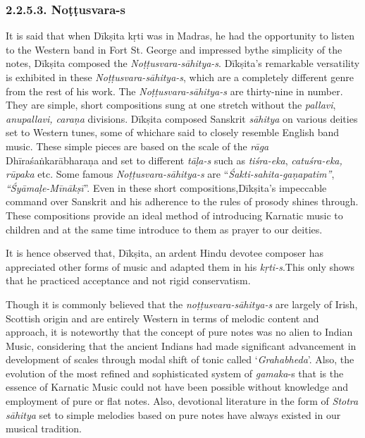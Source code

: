 \vspace{-.2cm}

\subsubsection*{2.2.5.3. Noṭṭusvara-s}

\vspace{-.2cm}

It is said that when Dīkṣita kṛti was in Madras, he had the opportunity to listen to the Western band in Fort St. George and impressed by\break the simplicity of the notes, Dīkṣita composed the \textit{Noṭṭusvara-\break sāhitya-s}. Dīkṣita's remarkable versatility is exhibited in these \textit{Noṭṭu\-svara-sāhitya-s}, which are a completely different genre from the rest of his work. The \textit{Noṭṭusvara-sāhitya-s} are thirty-nine in number. They are simple, short compositions sung at one stretch without the \textit{pallavi}, \textit{anupallavi, caraṇa} divisions. Dīkṣita composed Sanskrit \textit{sāhitya} on various deities set to Western tunes, some of whichare said to closely resemble English band music. These simple pieces are based on the scale of the \textit{rāga} Dhīra\-śaṅkarābharaṇa and set to different \textit{tāḷa-s} such as \textit{tiśra-eka}, \textit{catuśra-eka, rūpaka} etc. Some famous \textit{Noṭṭusvara-sāhitya-s} are “\textit{Śakti-sahita-gaṇapatim”}, \textit{“Śyāmaḷe-Mīnākṣī}”. Even in these short compositions,\break Dīkṣita's impeccable command over Sanskrit and his adherence to the rules of prosody shines through. These compositions provide an ideal method of introducing Karnatic music to children and at the same time introduce to them as prayer to our deities.

It is hence observed that, Dīkṣita, an ardent Hindu devotee composer has appreciated other forms of music and adapted them in his \textit{kṛti-s}.\break This only shows that he practiced acceptance and not rigid conservatism.

Though it is commonly believed that the \textit{noṭṭusvara-sāhitya-s} are largely of Irish, Scottish origin and are entirely Western in terms of melodic content and approach, it is noteworthy that the concept of pure notes was no alien to Indian Music, considering that the ancient Indians had made significant advancement in development of scales through modal shift of tonic called ‘\textit{Grahabheda}’. Also, the evolution of the most refined and sophisticated system of \textit{gamaka}-s that is the essence of Karnatic Music could not have been possible without knowledge and employment of pure or flat notes. Also, devotional literature in the form of \textit{Stotra sāhitya} set to simple melodies based on pure notes have always existed in our musical tradition.

